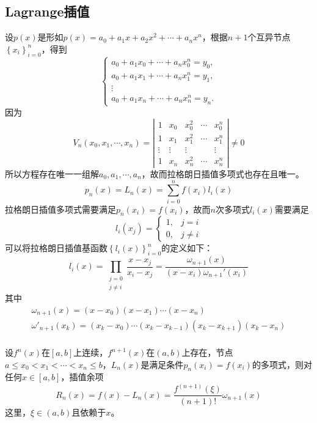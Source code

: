 \subsection{Lagrange插值}
设$p(x)$是形如$p(x) = a_0+a_1x+a_2x^2+\cdots+a_nx^n$，根据$n+1$个互异节点$\left\{ x_i \right\}_{i = 0}^{n}$，得到
\[
    \begin{cases}a_0+a_1x_0+\cdots+a_nx_0^n=y_0,\\a_0+a_1x_1+\cdots+a_nx_1^n=y_1,\\\vdots\\a_0+a_1x_n+\cdots+a_nx_n^n=y_n.\end{cases}
\]
因为
\[
    V_n(x_0,x_1,\cdots,x_n)=\left.\left|\begin{array}{ccccc}1&x_0&x_0^2&\cdots&x_0^n\\1&x_1&x_1^2&\cdots&x_1^n\\\vdots&\vdots&\vdots&&\vdots\\1&x_n&x_n^2&\cdots&x_n^n\end{array}\right.\right|\neq 0
\]
所以方程存在唯一一组解$a_0,a_1,\cdots,a_n$，故而拉格朗日插值多项式也存在且唯一。
\[
    p_n(x) = L_n(x) = \sum\limits_{i = 0}^{n}f(x_i)l_i(x)
\]
拉格朗日插值多项式需要满足$p_{n}(x_i) = f(x_i)$，故而$n$次多项式$l_i(x)$需要满足
\[
    l_i(x_j) = \left\{
        \begin{array}{ll}
            1, & j = i\\
            0, & j\neq i
        \end{array}
    \right.
\]
可以将拉格朗日插值基函数$\left\{ l_i(x) \right\}_{i = 0}^{n}$的定义如下：
\[
    l_{i}(x) = \prod\limits_{\substack{j = 0\\ j\neq i}}\dfrac{x-x_j}{x_i-x_j} = \dfrac{\omega_{n+1}(x)}{(x-x_i)\omega_{n+1}'(x_i)}
\]
其中
\[
    \begin{array}{l}

        \omega_{n+1}(x) = (x-x_0)(x-x_1)\cdots(x-x_n)\\
        \omega'_{n+1}(x_k) = (x_k-x_0)\cdots(x_k-x_{k-1})(x_k-x_{k+1})(x_k-x_n)\\
    \end{array}
\]
\begin{theorem}[插值余项定理]
    设$f^{n}(x)$在$\left[ a,b \right]$上连续，$f^{n+1}(x)$在$\left( a,b \right)$上存在，节点$a\leqslant x_0<x_1<\cdots<x_n\leqslant b$，$L_{n}(x)$是满足条件$p_{n}(x_i) = f(x_i)$的多项式，则对任何$x\in\left[ a,b \right]$，插值余项
    \[
        R_n(x) = f(x)-L_n(x) = \dfrac{f^{(n+1)}(\xi)}{(n+1)!}\omega_{n+1}(x)
    \]
    这里，$\xi\in(a,b)$且依赖于$x$。
\end{theorem}
